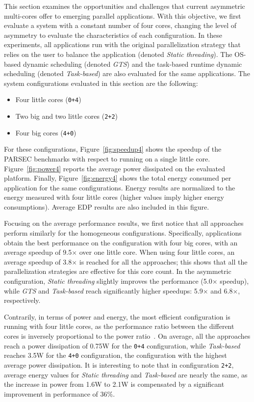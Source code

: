 This section examines the opportunities and challenges that current asymmetric multi-cores offer to emerging parallel applications. With this objective, we first evaluate a system with a constant number of four cores, changing the level of asymmetry to evaluate the characteristics of each configuration. In these experiments, all applications run with the original parallelization strategy that relies on the user to balance the application (denoted \emph{Static threading}). The OS-based dynamic scheduling (denoted \emph{GTS}) and the task-based runtime dynamic scheduling (denoted \emph{Task-based}) are also evaluated for the same applications. 
The system configurations evaluated in this section are the following:
\begin{itemize}
\item Four little cores (\texttt{0+4})
\item Two big and two little cores (\texttt{2+2})
\item Four big cores (\texttt{4+0})
\end{itemize}
For these configurations, Figure~\ref{fig:speedup4} shows the speedup of the PARSEC benchmarks with respect to running on a single little core. Figure~\ref{fig:power4} reports the average power dissipated on the evaluated platform. Finally, Figure~\ref{fig:energy4} shows the total energy consumed per application for the same configurations. Energy results are normalized to the energy measured with four little cores (higher values imply higher energy consumptions). Average EDP results are also included in this figure.

Focusing on the average performance results, we first notice that all approaches perform similarly for the homogeneous configurations. Specifically, applications obtain the best performance on the configuration with four big cores, with an average speedup of 9.5$\times$ over one little core. When using four little cores, an average speedup of 3.8$\times$ is reached for all the approaches; this shows that all the parallelization strategies are effective for this core count. In the asymmetric configuration, \emph{Static threading} slightly improves the performance (5.0$\times$ speedup), while \emph{GTS} and \emph{Task-based} reach significantly higher speedups: 5.9$\times$ and 6.8$\times$, respectively.

Contrarily, in terms of power and energy, the most efficient configuration is running with four little cores, as the performance ratio between the different cores is inversely proportional to the power ratio~\cite{Greenhalgh2011}. On average, all the approaches reach a power dissipation of 0.75W for the \texttt{0+4} configuration, while \emph{Task-based} reaches 3.5W for the \texttt{4+0} configuration, the configuration with the highest average power dissipation. It is interesting to note that in configuration \texttt{2+2}, average energy values for \emph{Static threading} and \emph{Task-based} are nearly the same, as the increase in power from 1.6W to 2.1W is compensated by a significant improvement in performance of 36\%.


